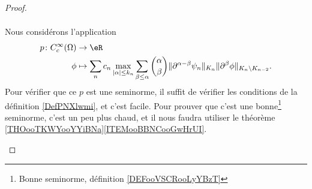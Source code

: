 \begin{proof}
\begin{subproof}
\begin{subequations}
\begin{align}
			\end{align}
		\end{subequations}
		Nous considérons l'application
		\begin{equation}
			\begin{aligned}
				p\colon C_c^{\infty}(\Omega) & \to \eR                                                                                                                                                                                \\
				\phi                         & \mapsto \sum_nc_n\max_{| \alpha |\leq k_n}\sum_{\beta\leq \alpha}\binom{ \alpha }{ \beta } \| \partial^{\alpha-\beta}\psi_n \|_{K_n}\| \partial^{\beta}\phi \|_{K_n\setminus K_{n-2}}.
			\end{aligned}
		\end{equation}
		Pour vérifier que ce \( p\) est une seminorme, il suffit de vérifier les conditions de la définition \ref{DefPNXlwmi}, et c'est facile. Pour prouver que c'est une bonne\footnote{Bonne seminorme, définition \ref{DEFooVSCRooLyYBzT}} seminorme, c'est un peu plus chaud, et il nous faudra utiliser le théorème \ref{THOooTKWYooYYiBNa}\ref{ITEMooBBNCooGwHrUI}.


\end{subproof}
\end{proof}
